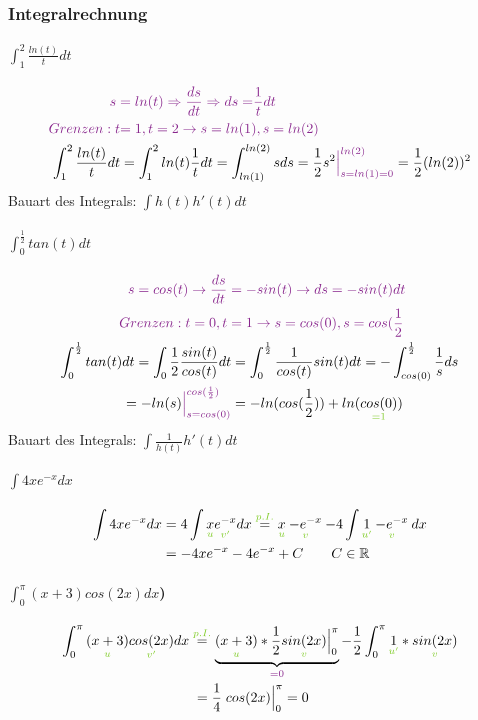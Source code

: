 \documentclass[12pt,a4paper]{article}%
\numberwithin{equation}{section}
\newcommand{\R}{\mathbb{R}} %
\newcommand{\subsubsubsection}{\paragraph}
\def\colBord#1{\begingroup\color{Fuchsia}{#1}\endgroup}
\def\colGreen#1{\begingroup\color{LimeGreen}{#1}\endgroup}
\def\usGreen#1#2{\underset{\colGreen{#1}}{#2}}
\numberwithin{equation}{subsection}
\begin{document}
	  \subsubsection{Integralrechnung}
	  \subsubsubsection{$\int_1^2 \frac{ln(t)}{t} dt$}
		\begin{align}
		\colBord{s }\; &\colBord{= ln(t) \Rightarrow \frac{ds}{dt} \Rightarrow ds} \;\colBord{=} \colBord{\frac{1}{t}dt} \nonumber\\
		\colBord{Grenzen: t } &\colBord{=} \;\colBord{1, t=2 \rightarrow s = ln(1), s = ln(2)} \nonumber \\
		\int_1^2 \frac{ln(t)}{t} dt &= \int_1^2 ln(t) \frac{1}{t} dt = \int_{ln(1)}^{ln(2)} s ds 
		= \frac{1}{2} s^2 \colBord{\Big|_{s = ln(1) = 0}^{ln(2)}} = \frac{1}{2}(ln(2))^2 
		\end{align}
		Bauart des Integrals: $\int h(t)h'(t)dt$
		
		\subsubsubsection{$\int_0^{\frac{1}{2}} tan(t) dt$}
		\begin{align}
			\colBord{s = cos(t) \rightarrow \frac{ds}{dt}} \; &\colBord{=} \; \colBord{-sin(t) \rightarrow ds = -sin(t) dt} \nonumber \\
			\colBord{Grenzen: t = 0, t } \; &\colBord{=} \; \colBord{1 \rightarrow s = cos(0), s = cos(\frac{1}{2}} \nonumber \\
			\int_0^{\frac{1}{2}} tan(t) dt = \int_{0}{\frac{1}{2}} \frac{sin(t)}{cos(t)} dt &= \int_0 ^{\frac{1}{2}} \frac{1}{cos(t)} sin(t) dt 
			= - \int_{cos(0)}^{\frac{1}{2}} \frac{1}{s} ds \nonumber \\
			= -ln(s)\colBord{\Big|_{s = cos(0)}^{cos(\frac{1}{2})}} &= -ln(cos(\frac{1}{2})) + ln(\usGreen{=1}{cos(0)})
		\end{align}
		Bauart des Integrals: $\int \frac{1}{h(t)}h'(t)dt$
		
		\subsubsubsection{$\int 4xe^{-x} dx$}
		\begin{align}
			\int 4xe^{-x} dx &= 4 \int \usGreen{u}{x} \usGreen{v'}{e^{-x}} dx 
			\overset{\colGreen{p.I.}}{=} \usGreen{u}{x} \usGreen{v}{-e^{-x}} 
			-4\int \usGreen{u'}{1} \usGreen{v}{-e^{-x}} dx \nonumber\\
			&= -4xe^{-x} -4e^{-x} + C 
			\qquad C\in\R \label{eq:ex1}
		\end{align}
		
		\subsubsubsection{$\int_0^{\pi}(x+3)cos(2x) dx$)}
		\begin{align}
			\int_0^{\pi} \usGreen{u}{(x+3)} \usGreen{v'}{cos(2x)}dx 
			&\overset{\colGreen{p.I.}}{=} \underbrace{\usGreen{u}{(x+3)} * \frac{1}{2}\usGreen{v}{sin(2x)}\Big|_0^{\pi}}_{\colBord{=0}}
			- \frac{1}{2} \int_0^{\pi} \usGreen{u'}{1} * \usGreen{v}{sin(2x)} \nonumber \\
			&\;=\frac{1}{4}\; cos(2x)\Big|_0^{\pi} = 0 \label{eq:ex2}
		\end{align}
		
\end{document}
